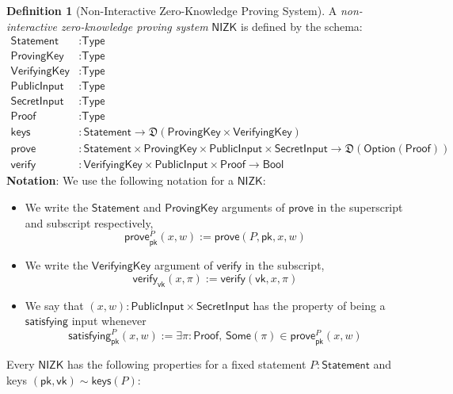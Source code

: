 \documentclass[a4paper]{article}
\theoremstyle{definition}
\newtheorem{definition}{Definition}[subsection]
\newcommand{\Bool}{{\textsf{Bool}}}
\newcommand{\NIZK}{{\textsf{NIZK}}}
\newcommand{\Option}{{\textsf{Option}}}
\newcommand{\Proof}{{\textsf{Proof}}}
\newcommand{\ProvingKey}{{\textsf{ProvingKey}}}
\newcommand{\PublicInput}{{\textsf{PublicInput}}}
\newcommand{\SecretInput}{{\textsf{SecretInput}}}
\newcommand{\Some}{{\textsf{Some}}}
\newcommand{\Statement}{{\textsf{Statement}}}
\newcommand{\Type}{{\textsf{Type}}}
\newcommand{\VerifyingKey}{{\textsf{VerifyingKey}}}
\newcommand{\keys}{{\textsf{keys}}}
\newcommand{\pk}{{\textsf{pk}}}
\newcommand{\prove}{{\textsf{prove}}}
\newcommand{\satisfying}{{\textsf{satisfying}}}
\newcommand{\verify}{{\textsf{verify}}}
\newcommand{\vk}{{\textsf{vk}}}
\begin{document}
\begin{definition}[Non-Interactive Zero-Knowledge Proving System]
    A \emph{non-interactive zero-knowledge proving system} $\NIZK$ is defined by the schema:
    \begin{align*}
        \Statement    &: \Type \\
        \ProvingKey   &: \Type \\
        \VerifyingKey &: \Type \\
        \PublicInput  &: \Type \\
        \SecretInput  &: \Type \\
        \Proof        &: \Type \\
        \keys         &: \Statement \to \mathfrak{D}(\ProvingKey \times \VerifyingKey) \\
        \prove        &: \Statement \times \ProvingKey \times \PublicInput \times \SecretInput \to \mathfrak{D}(\Option(\Proof)) \\
        \verify       &: \VerifyingKey \times \PublicInput \times \Proof \to \Bool
    \end{align*}
    \textbf{Notation}: We use the following notation for a $\NIZK$:
    \begin{itemize}
        \item We write the $\Statement$ and $\ProvingKey$ arguments of $\prove$ in the superscript and subscript respectively,
            \[\prove^P_\pk(x, w) := \prove(P, \pk, x, w)\]
        \item We write the $\VerifyingKey$ argument of $\verify$ in the subscript,
            \[\verify_\vk(x, \pi) := \verify(\vk, x, \pi)\]
        \item We say that $(x, w) : \PublicInput \times \SecretInput$ has the property of being a $\satisfying$ input whenever
            \[\satisfying^P_\pk(x, w) := \exists \pi : \Proof,\, \Some(\pi) \in \prove^P_\pk(x, w)\]
    \end{itemize}

    Every $\NIZK$ has the following properties for a fixed statement $P : \Statement$ and keys $(\pk, \vk) \sim \keys(P)$:


\end{definition}
\end{document}
